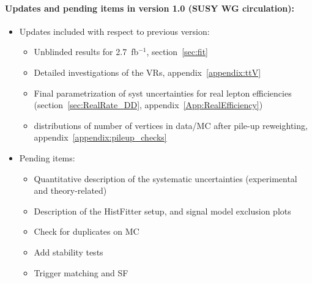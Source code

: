 \paragraph{Updates and pending items in version 1.0 (SUSY WG circulation):}
\begin{itemize}
\item Updates included with respect to previous version:
\begin{itemize}
\item Unblinded results for 2.7~fb$^{-1}$, section~\ref{sec:fit}
\item Detailed investigations of the VRs, appendix~\ref{appendix:ttV}
\item Final parametrization of syst uncertainties for real lepton efficiencies (section~\ref{sec:RealRate_DD}, appendix~\ref{App:RealEfficiency})
\item distributions of number of vertices in data/MC after pile-up reweighting, appendix~\ref{appendix:pileup_checks}
\end{itemize}

\item Pending items: 
\begin{itemize}
\item Quantitative description of the systematic uncertainties (experimental and theory-related)
\item Description of the HistFitter setup, and signal model exclusion plots
\item Check for duplicates on MC
\item Add stability tests
\item Trigger matching and SF
\end{itemize}

\end{itemize}

